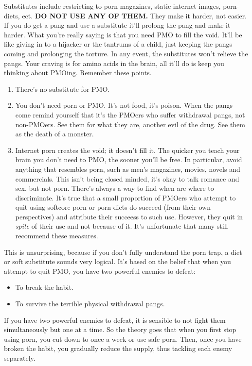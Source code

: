 \documentclass[easypeasy.tex]{subfiles}
\begin{document}
Substitutes include restricting to porn magazines, static internet images, porn-diets, ect. \textbf{DO NOT USE ANY OF THEM.} They make it harder, not easier. If you do get a pang and use a substitute it'll prolong the pang and make it harder. What you're really saying is that you need PMO to fill the void. It'll be like giving in to a hijacker or the tantrums of a child, just keeping the pangs coming and prolonging the torture. In any event, the substitutes won't relieve the pangs. Your craving is for amino acids in the brain, all it'll do is keep you thinking about PMOing. Remember these points.
\begin{enumerate}
  \item There's no substitute for PMO.
  \item You don't need porn or PMO. It's not food, it's poison. When the pangs come remind yourself that it's the PMOers who suffer withdrawal pangs, not non-PMOers. See them for what they are, another evil of the drug. See them as the death of a monster.
  \item Internet porn creates the void; it doesn't fill it. The quicker you teach your brain you don't need to PMO, the sooner you'll be free. In particular, avoid anything that resembles porn, such as men's magazines, movies, novels and commercials. This isn't being closed minded, it's okay to talk romance and sex, but not porn. There's always a way to find when are where to discriminate. It's true that a small proportion of PMOers who attempt to quit using softcore porn or porn diets do succeed (from their own perspectives) and attribute their succeess to such use. However, they quit in \textit{spite} of their use and not because of it. It's unfortunate that many still recommend these measures.
\end{enumerate}

This is unsurprising, because if you don't fully understand the porn trap, a diet or soft substitute sounds very logical. It's based on the belief that when you attempt to quit PMO, you have two powerful enemies to defeat:
\begin{itemize}
  \item To break the habit.
  \item To survive the terrible physical withdrawal pangs.
\end{itemize}

If you have two powerful enemies to defeat, it is sensible to not fight them simultaneously but one at a time. So the theory goes that when you first stop using porn, you cut down to once a week or use safe porn. Then, once you have broken the habit, you gradually reduce the supply, thus tackling each enemy separately.
\end{document}
